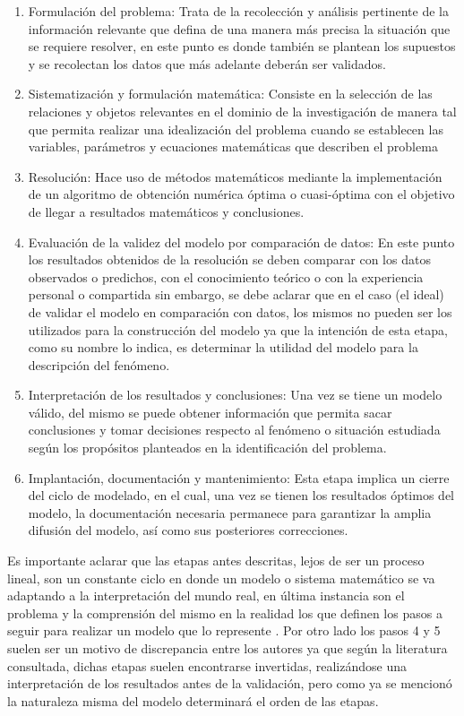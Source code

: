 \begin{enumerate}
    \item Formulación del problema: Trata de la recolección y análisis pertinente de la información relevante que defina de una manera más precisa la situación que se requiere resolver, en este punto es donde también se plantean los supuestos y se recolectan los datos que más adelante deberán ser validados.
    \item Sistematización y formulación matemática: Consiste en la selección de las relaciones y objetos relevantes en el dominio de la investigación de manera tal que permita realizar una idealización del problema cuando se establecen las variables, parámetros y ecuaciones matemáticas que describen el problema
    \item Resolución: Hace uso de métodos matemáticos mediante la implementación de un algoritmo de obtención numérica óptima o cuasi-óptima con el objetivo de llegar a resultados matemáticos y conclusiones.
    \item Evaluación de la validez del modelo por comparación de datos: En este punto los resultados obtenidos de la resolución se deben comparar con los datos observados o predichos, con el conocimiento teórico o con la experiencia personal o compartida sin embargo, se debe aclarar que en el caso (el ideal) de validar el modelo en comparación con datos, los mismos no pueden ser los utilizados para la construcción del modelo ya que la intención de esta etapa, como su nombre lo indica, es determinar la utilidad del modelo para la descripción del fenómeno.
    \item Interpretación de los resultados y conclusiones: Una vez se tiene un modelo válido, del mismo se puede obtener información que permita sacar conclusiones y tomar decisiones respecto al fenómeno o situación estudiada según los propósitos planteados en la identificación del problema. 
    \item Implantación, documentación y mantenimiento: Esta etapa implica un cierre del ciclo de modelado, en el cual, una vez se tienen los resultados óptimos del modelo, la documentación necesaria permanece para garantizar la amplia difusión del modelo, así como sus posteriores correcciones.
\end{enumerate}

Es importante aclarar que las etapas antes descritas, lejos de ser un proceso lineal, son un constante ciclo en donde un modelo o sistema matemático se va adaptando a la interpretación del mundo real, en última instancia son el problema y la comprensión del mismo en la realidad los que definen los pasos a seguir para realizar un modelo que lo represente \cite{morten}. Por otro lado los pasos 4 y 5 suelen ser un motivo de discrepancia entre los autores ya que según la literatura consultada, dichas etapas suelen encontrarse invertidas, realizándose una interpretación de los resultados antes de la validación, pero como ya se mencionó la naturaleza misma del modelo determinará el orden de las etapas.

